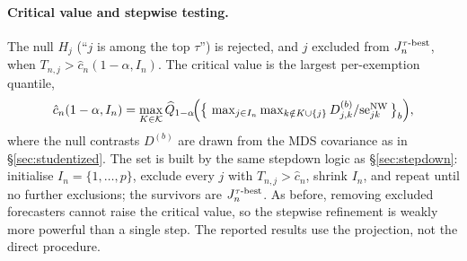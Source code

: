 \paragraph{Critical value and stepwise testing.} The null $H_j$ (``$j$ is among the top
$\tau$'') is rejected, and $j$ excluded from $J^{\tau\text{-best}}_n$, when
$T_{n,j}>\hat{c}_n(1-\alpha,I_n)$. The critical value is the largest per-exemption
quantile,
\begin{equation}
  \hat{c}_n(1-\alpha,I_n)=\max_{K\in\mathcal{K}}
  \widehat{Q}_{1-\alpha}\!\Big(\big\{\,\textstyle\max_{j\in I_n}\max_{k\notin K\cup\{j\}}
  D^{(b)}_{j,k}/\mathrm{se}^{\mathrm{NW}}_{jk}\,\big\}_{b}\Big),
\end{equation}
where the null contrasts $D^{(b)}$ are drawn from the MDS covariance as in
\S\ref{sec:studentized}. The set is built by the same stepdown logic as
\S\ref{sec:stepdown}: initialise $I_n=\{1,\dots,p\}$, exclude every $j$ with
$T_{n,j}>\hat{c}_n$, shrink $I_n$, and repeat until no further exclusions; the survivors
are $J^{\tau\text{-best}}_n$. As before, removing excluded forecasters cannot raise the critical value,
so the stepwise refinement is weakly more powerful than a single step. The reported
results use the projection, not the direct procedure.
